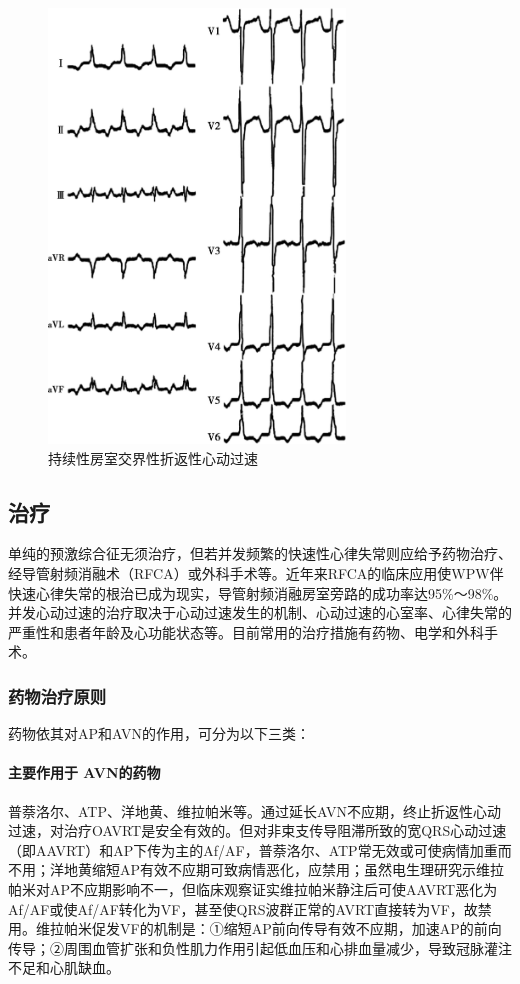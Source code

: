 \begin{figure}[!htbp]
 \centering
 \includegraphics[width=3.10417in,height=4.54167in]{./images/Image00451.jpg}
 \captionsetup{justification=centering}
 \caption{持续性房室交界性折返性心动过速}
 \label{fig102-14}
  \end{figure} 

\subsection{治疗}

单纯的预激综合征无须治疗，但若并发频繁的快速性心律失常则应给予药物治疗、经导管射频消融术（RFCA）或外科手术等。近年来RFCA的临床应用使WPW伴快速心律失常的根治已成为现实，导管射频消融房室旁路的成功率达95\%～98\%。并发心动过速的治疗取决于心动过速发生的机制、心动过速的心室率、心律失常的严重性和患者年龄及心功能状态等。目前常用的治疗措施有药物、电学和外科手术。

\subsubsection{药物治疗原则}

药物依其对AP和AVN的作用，可分为以下三类：

\paragraph{主要作用于 AVN的药物}

普萘洛尔、ATP、洋地黄、维拉帕米等。通过延长AVN不应期，终止折返性心动过速，对治疗OAVRT是安全有效的。但对非束支传导阻滞所致的宽QRS心动过速（即AAVRT）和AP下传为主的Af/AF，普萘洛尔、ATP常无效或可使病情加重而不用；洋地黄缩短AP有效不应期可致病情恶化，应禁用；虽然电生理研究示维拉帕米对AP不应期影响不一，但临床观察证实维拉帕米静注后可使AAVRT恶化为Af/AF或使Af/AF转化为VF，甚至使QRS波群正常的AVRT直接转为VF，故禁用。维拉帕米促发VF的机制是：①缩短AP前向传导有效不应期，加速AP的前向传导；②周围血管扩张和负性肌力作用引起低血压和心排血量减少，导致冠脉灌注不足和心肌缺血。

